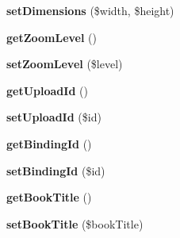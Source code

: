 \begin{DoxyCompactItemize}
\item 
\hypertarget{classScan_a1218a62529873d92b384150adf99f6fc}{
{\bfseries setDimensions} (\$width, \$height)}
\label{classScan_a1218a62529873d92b384150adf99f6fc}

\item 
\hypertarget{classScan_a5d594d9549e5245eb615220d237bd2ff}{
{\bfseries getZoomLevel} ()}
\label{classScan_a5d594d9549e5245eb615220d237bd2ff}

\item 
\hypertarget{classScan_aa5863f8a7d2ae5b0cc7031a9bfbe95c3}{
{\bfseries setZoomLevel} (\$level)}
\label{classScan_aa5863f8a7d2ae5b0cc7031a9bfbe95c3}

\item 
\hypertarget{classScan_a0c9f1882dfffc926d467c965cf5a6268}{
{\bfseries getUploadId} ()}
\label{classScan_a0c9f1882dfffc926d467c965cf5a6268}

\item 
\hypertarget{classScan_aca340f58f479e7bf977147daa04ee600}{
{\bfseries setUploadId} (\$id)}
\label{classScan_aca340f58f479e7bf977147daa04ee600}

\item 
\hypertarget{classScan_ac218b7dc038391a7b28c7f349a5e118d}{
{\bfseries getBindingId} ()}
\label{classScan_ac218b7dc038391a7b28c7f349a5e118d}

\item 
\hypertarget{classScan_a1a8bc072e1803d13a6960f4aa3ff8d5b}{
{\bfseries setBindingId} (\$id)}
\label{classScan_a1a8bc072e1803d13a6960f4aa3ff8d5b}

\item 
\hypertarget{classScan_a0d28f287b97973b756d7823b7e154481}{
{\bfseries getBookTitle} ()}
\label{classScan_a0d28f287b97973b756d7823b7e154481}

\item 
\hypertarget{classScan_ad2aaa44d05619bc5df9ef401956d1aa9}{
{\bfseries setBookTitle} (\$bookTitle)}
\label{classScan_ad2aaa44d05619bc5df9ef401956d1aa9}

\end{DoxyCompactItemize}
